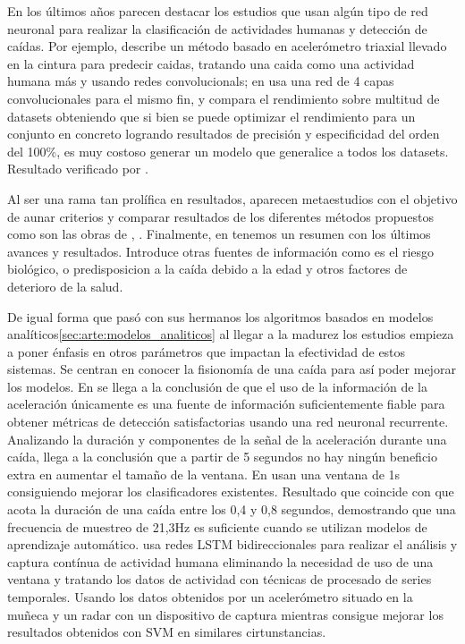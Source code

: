 En los últimos años parecen destacar los estudios que usan algún tipo de red neuronal \cite{Musci2020,Shi2020,Casilari2020,Liu2020} para realizar la clasificación de actividades humanas y detección de caídas. Por ejemplo,  describe un método basado en acelerómetro triaxial llevado en la cintura para predecir caidas, tratando una caida como una actividad humana más y usando redes convolucionals; en  usa una red de 4 capas convolucionales para el mismo fin, y compara el rendimiento sobre multitud de datasets obteniendo que si bien se puede optimizar el rendimiento para un conjunto en concreto logrando resultados de precisión y especificidad del orden del 100\%, es muy costoso generar un modelo que generalice a todos los datasets. Resultado verificado por .

Al ser una rama tan prolífica en resultados, aparecen metaestudios con el objetivo de aunar criterios y comparar resultados de los diferentes métodos propuestos como son las obras de , . Finalmente, en \cite{Anita2020} tenemos un resumen con los últimos avances y resultados. Introduce otras fuentes de información como es el riesgo biológico, o predisposicion a la caída debido a la edad y otros factores de deterioro de la salud.

De igual forma que pasó con sus hermanos los algoritmos basados en modelos analíticos\ref{sec:arte:modelos_analiticos} al llegar a la madurez los estudios empieza a poner énfasis en otros parámetros que impactan la efectividad de estos sistemas. Se centran en conocer la fisionomía de una caída para así poder mejorar los modelos. En \cite[p.6]{Musci2020} se llega a la conclusión de que el uso de la información de la aceleración únicamente es una fuente de información suficientemente fiable para obtener métricas de detección satisfactorias usando una red neuronal recurrente. Analizando la duración y componentes de la señal de la aceleración durante una caída,  llega a la conclusión que a partir de 5 segundos no hay ningún beneficio extra en aumentar el tamaño de la ventana. En \cite[p.59]{Hassan2019} usan una ventana de 1s consiguiendo mejorar los clasificadores existentes. Resultado que coincide con \cite[p.2]{Liu2018} que acota la duración de una caída entre los 0,4 y 0,8 segundos, demostrando que una frecuencia de muestreo de 21,3Hz es suficiente cuando se utilizan modelos de aprendizaje automático.  usa redes LSTM bidireccionales para realizar el análisis y captura contínua de actividad humana eliminando la necesidad de uso de una ventana y tratando los datos de actividad con técnicas de procesado de series temporales. Usando los datos obtenidos por un acelerómetro situado en la muñeca y un radar con un dispositivo de captura  mientras consigue mejorar los resultados obtenidos con SVM en similares cirtunstancias\cite[p.~9]{Li2019}.


